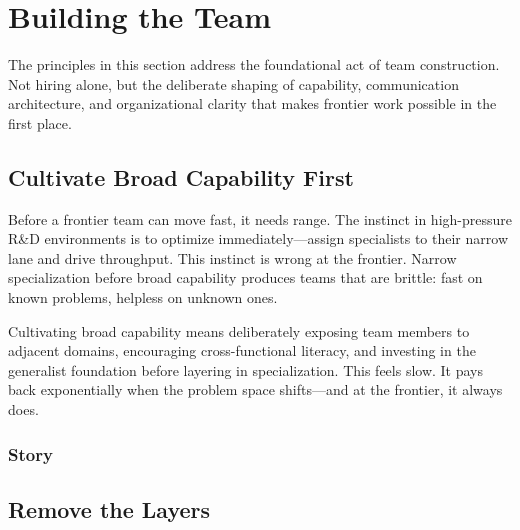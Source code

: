 
\chapter{Building the Team}


The principles in this section address the foundational act of team construction.
Not hiring alone, but the deliberate shaping of capability, communication architecture,
and organizational clarity that makes frontier work possible in the first place.

\section{Cultivate Broad Capability First}


Before a frontier team can move fast, it needs range. The instinct in high-pressure
R\&D environments is to optimize immediately---assign specialists to their narrow lane
and drive throughput. This instinct is wrong at the frontier. Narrow specialization
before broad capability produces teams that are brittle: fast on known problems,
helpless on unknown ones.

Cultivating broad capability means deliberately exposing team members to adjacent
domains, encouraging cross-functional literacy, and investing in the generalist
foundation before layering in specialization. This feels slow. It pays back
exponentially when the problem space shifts---and at the frontier, it always does.

\subsection{Story}

\section{Remove the Layers}

